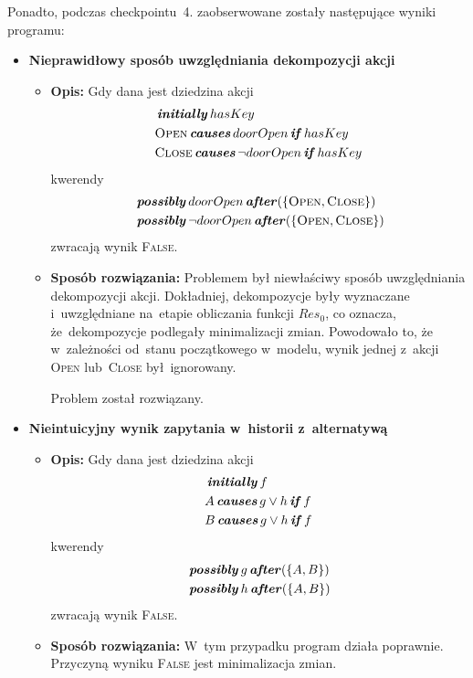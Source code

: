 \documentclass[11pt,a4paper]{article}
\DeclareMathOperator{\Initially}{\textbf{\textit{initially}}}
\DeclareMathOperator{\After}{\textbf{\textit{after}}}
\DeclareMathOperator{\Causes}{\textbf{\textit{causes}}}
\DeclareMathOperator{\If}{\textbf{\textit{if}}}
\DeclareMathOperator{\Possibly}{\textbf{\textit{possibly}}}
\begin{document}
Ponadto, podczas checkpointu~4. zaobserwowane zostały następujące wyniki programu:

\begin{itemize}
    \item \textbf{Nieprawidłowy sposób uwzględniania dekompozycji akcji}
    \begin{itemize}
        \item \textbf{Opis:}
        Gdy dana jest dziedzina akcji
        \begin{align*}
            & \Initially hasKey \\
            & \textsc{Open} \Causes doorOpen \If hasKey \\
            & \textsc{Close} \Causes \neg doorOpen \If hasKey
        \end{align*}
        kwerendy
        \begin{align*}
            & \Possibly doorOpen \After (\{\textsc{Open}, \textsc{Close}\}) \\
            & \Possibly \neg doorOpen \After (\{\textsc{Open}, \textsc{Close}\})
        \end{align*}
        zwracają wynik \textsc{False}.
        \item \textbf{Sposób rozwiązania:}
        Problemem był niewłaściwy sposób uwzględniania dekompozycji akcji.
        Dokładniej, dekompozycje były wyznaczane i~uwzględniane na~etapie obliczania funkcji ${Res}_0$, co oznacza, że~dekompozycje podlegały minimalizacji zmian.
        Powodowało to, że w~zależności od~stanu początkowego w~modelu, wynik jednej z~akcji \textsc{Open} lub~\textsc{Close} był~ignorowany.

        Problem został rozwiązany.
    \end{itemize}
    \item \textbf{Nieintuicyjny wynik zapytania w~historii z~alternatywą}
    \begin{itemize}
        \item \textbf{Opis:}
        Gdy dana jest dziedzina akcji
        \begin{align*}
            & \Initially f \\
            & A \Causes g \lor h \If f \\
            & B \Causes g \lor h \If f
        \end{align*}
        kwerendy
        \begin{align*}
            & \Possibly g \After (\{A, B\}) \\
            & \Possibly h \After (\{A, B\})
        \end{align*}
        zwracają wynik \textsc{False}.
        \item \textbf{Sposób rozwiązania:}
        W~tym przypadku program działa poprawnie.
        Przyczyną wyniku \textsc{False} jest minimalizacja zmian.


\end{itemize}
\end{itemize}
\end{document}
